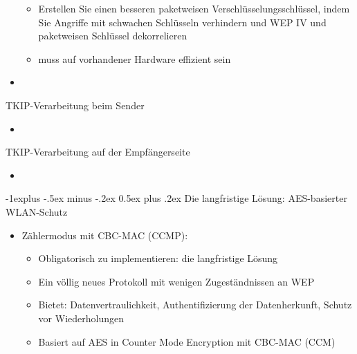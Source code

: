 \documentclass[a4paper]{article}
\makeatletter
\renewcommand{\subsection}{\@startsection{subsection}{2}{0mm}%
 {-1explus -.5ex minus -.2ex}%
 {0.5ex plus .2ex}%
 {\normalfont\normalsize\bfseries}}
\makeatother
\begin{document}
\begin{multicols}{3}
\begin{itemize}
              \begin{itemize}
                  \item
                        Erstellen Sie einen besseren paketweisen Verschlüsselungsschlüssel,
                        indem Sie Angriffe mit schwachen Schlüsseln verhindern und WEP IV
                        und paketweisen Schlüssel dekorrelieren
                  \item
                        muss auf vorhandener Hardware effizient sein
              \end{itemize}
        \item
    \end{itemize}

    TKIP-Verarbeitung beim Sender

    \begin{itemize}
        \item
    \end{itemize}

    TKIP-Verarbeitung auf der Empfängerseite

    \begin{itemize}
        \item
    \end{itemize}


    \subsection{Die langfristige Lösung: AES-basierter
        WLAN-Schutz}

    \begin{itemize}
        \item
              Zählermodus mit CBC-MAC (CCMP):

              \begin{itemize}
                  \item
                        Obligatorisch zu implementieren: die langfristige Lösung
                  \item
                        Ein völlig neues Protokoll mit wenigen Zugeständnissen an WEP
                  \item
                        Bietet: Datenvertraulichkeit, Authentifizierung der Datenherkunft,
                        Schutz vor Wiederholungen
                  \item
                        Basiert auf AES in Counter Mode Encryption mit CBC-MAC (CCM)


\end{itemize}
\end{itemize}
\end{multicols}
\end{document}
